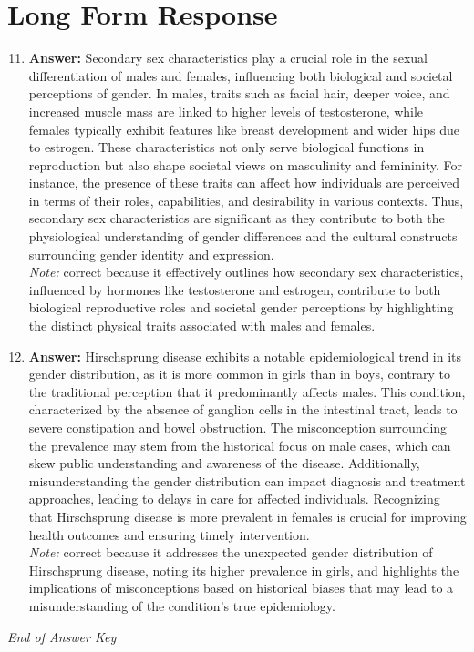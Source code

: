 \documentclass[12pt]{article}
\begin{document}
\section*{Long Form Response}
\begin{enumerate}[label=\arabic*.]
\setcounter{enumi}{10}
\item \textbf{Answer:} Secondary sex characteristics play a crucial role in the sexual differentiation of males and females, influencing both biological and societal perceptions of gender. In males, traits such as facial hair, deeper voice, and increased muscle mass are linked to higher levels of testosterone, while females typically exhibit features like breast development and wider hips due to estrogen. These characteristics not only serve biological functions in reproduction but also shape societal views on masculinity and femininity. For instance, the presence of these traits can affect how individuals are perceived in terms of their roles, capabilities, and desirability in various contexts. Thus, secondary sex characteristics are significant as they contribute to both the physiological understanding of gender differences and the cultural constructs surrounding gender identity and expression.
\\ \textit{Note:} correct because it effectively outlines how secondary sex characteristics, influenced by hormones like testosterone and estrogen, contribute to both biological reproductive roles and societal gender perceptions by highlighting the distinct physical traits associated with males and females.
\item \textbf{Answer:} Hirschsprung disease exhibits a notable epidemiological trend in its gender distribution, as it is more common in girls than in boys, contrary to the traditional perception that it predominantly affects males. This condition, characterized by the absence of ganglion cells in the intestinal tract, leads to severe constipation and bowel obstruction. The misconception surrounding the prevalence may stem from the historical focus on male cases, which can skew public understanding and awareness of the disease. Additionally, misunderstanding the gender distribution can impact diagnosis and treatment approaches, leading to delays in care for affected individuals. Recognizing that Hirschsprung disease is more prevalent in females is crucial for improving health outcomes and ensuring timely intervention.
\\ \textit{Note:} correct because it addresses the unexpected gender distribution of Hirschsprung disease, noting its higher prevalence in girls, and highlights the implications of misconceptions based on historical biases that may lead to a misunderstanding of the condition's true epidemiology.
\end{enumerate}

\vfill
\noindent\textit{End of Answer Key}
\end{document}
